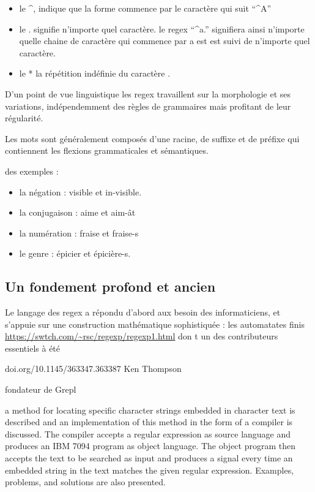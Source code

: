 \documentclass[
]{book}
\providecommand{\tightlist}{%
  \setlength{\itemsep}{0pt}\setlength{\parskip}{0pt}}
\begin{document}
\begin{itemize}
\item
  le \^{}, indique que la forme commence par le caractère qui suit ``\^{}A''
\item
  le . signifie n'importe quel caractère. le regex ``\^{}a.'' signifiera ainsi n'importe quelle chaine de caractère qui commence par a est est suivi de n'importe quel caractère.
\item
  le * la répétition indéfinie du caractère .
\end{itemize}

D'un point de vue linguistique les regex travaillent sur la morphologie et ses variations, indépendemment des règles de grammaires mais profitant de leur régularité.

Les mots sont généralement composés d'une racine, de suffixe et de préfixe qui contiennent les flexions grammaticales et sémantiques.

des exemples :

\begin{itemize}
\tightlist
\item
  la négation : visible et in-visible.
\item
  la conjugaison : aime et aim-ât
\item
  la numération : fraise et fraise-s
\item
  le genre : épicier et épicière-s.
\end{itemize}

\hypertarget{un-fondement-profond-et-ancien}{%
\subsection{Un fondement profond et ancien}\label{un-fondement-profond-et-ancien}}

Le langage des regex a répondu d'abord aux besoin des informaticiens, et s'appuie sur une construction mathématique sophistiquée : les automatates finis
\url{https://swtch.com/~rsc/regexp/regexp1.html} don t un des contributeurs essentiels à été

doi.org/10.1145/363347.363387 Ken Thompson

fondateur de Grepl

a method for locating specific character strings embedded in character text is described and an implementation of this method in the form of a compiler is discussed. The compiler accepts a regular expression as source language and produces an IBM 7094 program as object language. The object program then accepts the text to be searched as input and produces a signal every time an embedded string in the text matches the given regular expression. Examples, problems, and solutions are also presented.
\end{document}
